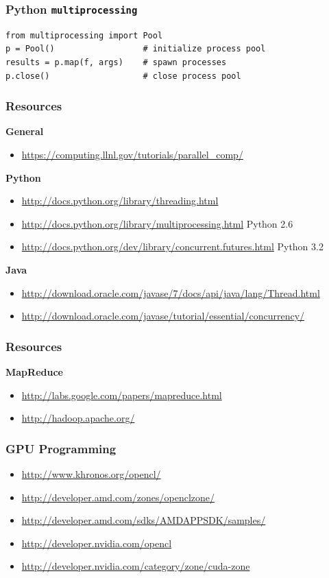 \documentclass[t]{beamer}
\begin{document}
\begin{frame}[fragile]
\frametitle{Python \texttt{multiprocessing}}
\begin{verbatim}
from multiprocessing import Pool
p = Pool()                  # initialize process pool
results = p.map(f, args)    # spawn processes
p.close()                   # close process pool 
\end{verbatim}
\end{frame}

\begin{frame}
\frametitle{Resources}
\textbf{General}
\begin{itemize}
  \item \url{https://computing.llnl.gov/tutorials/parallel_comp/}
\end{itemize}

\textbf{Python}
\begin{itemize}
  \item \url{http://docs.python.org/library/threading.html}
  \item \url{http://docs.python.org/library/multiprocessing.html} \tiny{Python 2.6}
  \item \url{http://docs.python.org/dev/library/concurrent.futures.html} \tiny{Python 3.2}
\end{itemize}

\textbf{Java}
\begin{itemize}
  \item \url{http://download.oracle.com/javase/7/docs/api/java/lang/Thread.html}
  \item \url{http://download.oracle.com/javase/tutorial/essential/concurrency/}
\end{itemize}
\end{frame}
\begin{frame}
\frametitle{Resources}
\textbf{MapReduce}
\begin{itemize}
  \item \url{http://labs.google.com/papers/mapreduce.html}
  \item \url{http://hadoop.apache.org/}
\end{itemize}
\end{frame}

\begin{frame}
\frametitle{GPU Programming}
\begin{itemize}
  \item \url{http://www.khronos.org/opencl/}
  \item \url{http://developer.amd.com/zones/openclzone/}
  \item \url{http://developer.amd.com/sdks/AMDAPPSDK/samples/}
  \item \url{http://developer.nvidia.com/opencl}
  \item \url{http://developer.nvidia.com/category/zone/cuda-zone}
\end{itemize}
\end{frame}

\frame{\tableofcontents}

\frame{\titlepage}
\end{document}
